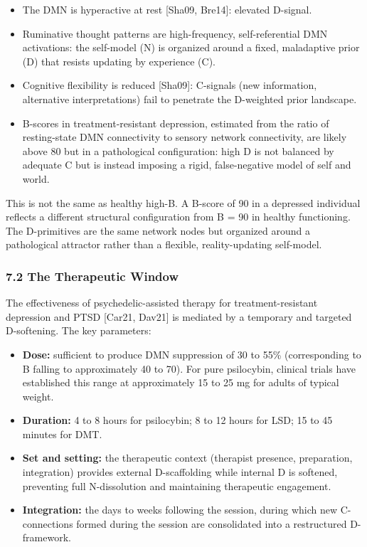 \documentclass[
  11pt,
  letterpaper,
]{article}
\providecommand{\tightlist}{%
  \setlength{\itemsep}{0pt}\setlength{\parskip}{0pt}}
\begin{document}
\begin{itemize}
\tightlist
\item
  The DMN is hyperactive at rest {[}Sha09, Bre14{]}: elevated D-signal.
\item
  Ruminative thought patterns are high-frequency, self-referential DMN
  activations: the self-model (N) is organized around a fixed,
  maladaptive prior (D) that resists updating by experience (C).
\item
  Cognitive flexibility is reduced {[}Sha09{]}: C-signals (new
  information, alternative interpretations) fail to penetrate the
  D-weighted prior landscape.
\item
  B-scores in treatment-resistant depression, estimated from the ratio
  of resting-state DMN connectivity to sensory network connectivity, are
  likely above 80 but in a pathological configuration: high D is not
  balanced by adequate C but is instead imposing a rigid, false-negative
  model of self and world.
\end{itemize}

This is not the same as healthy high-B. A B-score of 90 in a depressed
individual reflects a different structural configuration from B = 90 in
healthy functioning. The D-primitives are the same network nodes but
organized around a pathological attractor rather than a flexible,
reality-updating self-model.

\subsubsection{7.2 The Therapeutic Window}\label{the-therapeutic-window}

The effectiveness of psychedelic-assisted therapy for
treatment-resistant depression and PTSD {[}Car21, Dav21{]} is mediated
by a temporary and targeted D-softening. The key parameters:

\begin{itemize}
\tightlist
\item
  \textbf{Dose:} sufficient to produce DMN suppression of 30 to 55\%
  (corresponding to B falling to approximately 40 to 70). For pure
  psilocybin, clinical trials have established this range at
  approximately 15 to 25 mg for adults of typical weight.
\item
  \textbf{Duration:} 4 to 8 hours for psilocybin; 8 to 12 hours for LSD;
  15 to 45 minutes for DMT.
\item
  \textbf{Set and setting:} the therapeutic context (therapist presence,
  preparation, integration) provides external D-scaffolding while
  internal D is softened, preventing full N-dissolution and maintaining
  therapeutic engagement.
\item
  \textbf{Integration:} the days to weeks following the session, during
  which new C-connections formed during the session are consolidated
  into a restructured D-framework.
\end{itemize}
\end{document}
